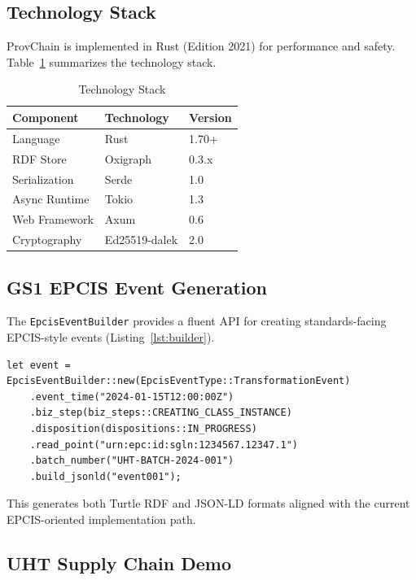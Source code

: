 \documentclass[preprint,review,12pt,authoryear]{elsarticle}
\begin{document}
\subsection{Technology Stack}

ProvChain is implemented in Rust (Edition 2021) for performance and safety. Table~\ref{tab:stack} summarizes the technology stack.

\begin{table}[htbp]
\centering
\caption{Technology Stack}
\label{tab:stack}
\begin{tabular}{@{}lll@{}}
\toprule
\textbf{Component} & \textbf{Technology} & \textbf{Version} \\
\midrule
Language & Rust & 1.70+ \\
RDF Store & Oxigraph & 0.3.x \\
Serialization & Serde & 1.0 \\
Async Runtime & Tokio & 1.3 \\
Web Framework & Axum & 0.6 \\
Cryptography & Ed25519-dalek & 2.0 \\
\bottomrule
\end{tabular}
\end{table}

\subsection{GS1 EPCIS Event Generation}

The \texttt{EpcisEventBuilder} provides a fluent API for creating standards-facing EPCIS-style events (Listing~\ref{lst:builder}).

\begin{lstlisting}[caption={EPCIS Event Builder (Rust)}, label={lst:builder}]
let event = EpcisEventBuilder::new(EpcisEventType::TransformationEvent)
    .event_time("2024-01-15T12:00:00Z")
    .biz_step(biz_steps::CREATING_CLASS_INSTANCE)
    .disposition(dispositions::IN_PROGRESS)
    .read_point("urn:epc:id:sgln:1234567.12347.1")
    .batch_number("UHT-BATCH-2024-001")
    .build_jsonld("event001");
\end{lstlisting}

This generates both Turtle RDF and JSON-LD formats aligned with the current EPCIS-oriented implementation path.

\subsection{UHT Supply Chain Demo}
\end{document}
